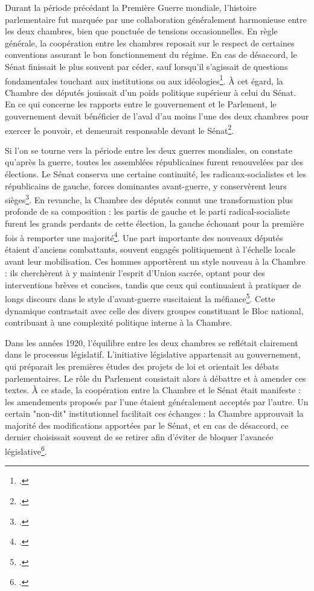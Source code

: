 \documentclass[a4paper,twoside,12pt]{book}
\begin{document}
Durant la période précédant la Première Guerre mondiale, l'histoire parlementaire fut marquée par une collaboration généralement harmonieuse entre les deux chambres, bien que ponctuée de tensions occasionnelles. En règle générale, la coopération entre les chambres reposait sur le respect de certaines conventions assurant le bon fonctionnement du régime. En cas de désaccord, le Sénat finissait le plus souvent par céder, sauf lorsqu'il s'agissait de questions fondamentales touchant aux institutions ou aux idéologies\footcite[p.196]{morel2024}. À cet égard, la Chambre des députés jouissait d'un poids politique supérieur à celui du Sénat. En ce qui concerne les rapports entre le gouvernement et le Parlement, le gouvernement devait bénéficier de l'aval d'au moins l'une des deux chambres pour exercer le pouvoir, et demeurait responsable devant le Sénat\footcite[p.197]{morel2024}.

Si l'on se tourne vers la période entre les deux guerres mondiales, on constate qu'après la guerre, toutes les assemblées républicaines furent renouvelées par des élections. Le Sénat conserva une certaine continuité, les radicaux-socialistes et les républicains de gauche, forces dominantes avant-guerre, y conservèrent leurs sièges\footcite[p.337]{zotero-515}. En revanche, la Chambre des députés connut une transformation plus profonde de sa composition : les partis de gauche et le parti radical-socialiste furent les grands perdants de cette élection, la gauche échouant pour la première fois à remporter une majorité\footcite[p.338]{zotero-515}. Une part importante des nouveaux députés étaient d'anciens combattants, souvent engagés politiquement à l'échelle locale avant leur mobilisation. Ces hommes apportèrent un style nouveau à la Chambre : ils cherchèrent à y maintenir l'esprit d'Union sacrée, optant pour des interventions brèves et concises, tandis que ceux qui continuaient à pratiquer de longs discours dans le style d'avant-guerre suscitaient la méfiance\footcite[p.339]{zotero-515}. Cette dynamique contrastait avec celle des divers groupes constituant le Bloc national, contribuant à une complexité politique interne à la Chambre.

Dans les années 1920, l'équilibre entre les deux chambres se reflétait clairement dans le processus législatif. L'initiative législative appartenait au gouvernement, qui préparait les premières études des projets de loi et orientait les débats parlementaires. Le rôle du Parlement consistait alors à débattre et à amender ces textes. À ce stade, la coopération entre la Chambre et le Sénat était manifeste : les amendements proposés par l'une étaient généralement acceptés par l'autre. Un certain "non-dit" institutionnel facilitait ces échanges : la Chambre approuvait la majorité des modifications apportées par le Sénat, et en cas de désaccord, ce dernier choisissait souvent de se retirer afin d'éviter de bloquer l'avancée législative\footcite[p.345]{zotero-515}.
\end{document}
